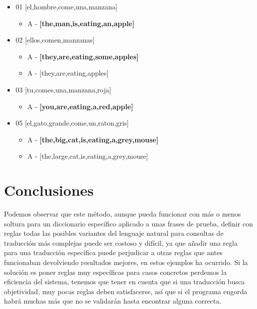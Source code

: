 \documentclass{article}
\begin{document}
\begin{itemize}
    \item 01 [el,hombre,come,una,manzana]
    \begin{itemize}
        \item A - \textbf{[the,man,is,eating,an,apple]}
    \end{itemize}
    
    \item 02 [ellos,comen,manzanas]    
    \begin{itemize}
        \item A - \textbf{[they,are,eating,some,apples]}
        \item A - [they,are,eating,apples]
    \end{itemize}

    \item 03 [tu,comes,una,manzana,roja]
    \begin{itemize}
        \item A - \textbf{[you,are,eating,a,red,apple]}
    \end{itemize}

    \item 05 [el,gato,grande,come,un,raton,gris]
    \begin{itemize}
        \item A - \textbf{[the,big,cat,is,eating,a,grey,mouse]}
        \item A - [the,large,cat,is,eating,a,grey,mouse]
    \end{itemize}

\end{itemize}


\section{Conclusiones}
Podemos observar que este método, aunque pueda funcionar con más o menos soltura para un diccionario específico aplicado a 
unas frases de prueba, definir con reglas todas las posibles variantes del lenguaje natural para consultas de traducción más complejas 
puede ser costoso y difícil, ya que añadir una regla para una traducción específica puede perjudicar a otras reglas 
que antes funcionaban devolviendo resultados mejores, en estos ejemplos ha ocurrido. Si la solución es poner reglas muy específicas 
para casos concretos perdemos la eficiencia del sistema, tenemos que tener en cuenta que si una traducción busca objetividad, 
muy pocas reglas deben satisfacerse, así que si el programa engorda habrá muchas más que no se validarán hasta encontrar alguna correcta.
\end{document}
